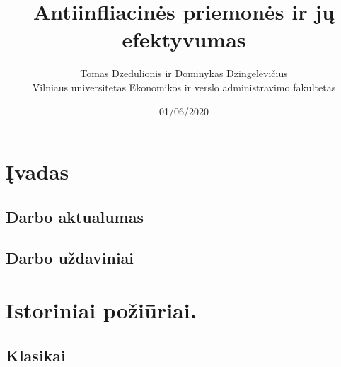 \documentclass[
]{article}
\title{Antiinfliacinės priemonės ir jų efektyvumas}
\author{Tomas Dzedulionis ir Dominykas Dzingelevičius\\
Vilniaus universitetas Ekonomikos ir verslo administravimo fakultetas}
\date{01/06/2020}
\begin{document}
\maketitle

{
\setcounter{tocdepth}{3}
\tableofcontents
}
\newpage

\hypertarget{ux12fvadas}{%
\section{Įvadas}\label{ux12fvadas}}

\hypertarget{darbo-aktualumas}{%
\subsection{Darbo aktualumas}\label{darbo-aktualumas}}

\hypertarget{darbo-uux17edaviniai}{%
\subsection{Darbo uždaviniai}\label{darbo-uux17edaviniai}}

\newpage

\hypertarget{istoriniai-poux17eiux16briai.}{%
\section{Istoriniai požiūriai.}\label{istoriniai-poux17eiux16briai.}}

\hypertarget{klasikai}{%
\subsection{Klasikai}\label{klasikai}}
\end{document}
